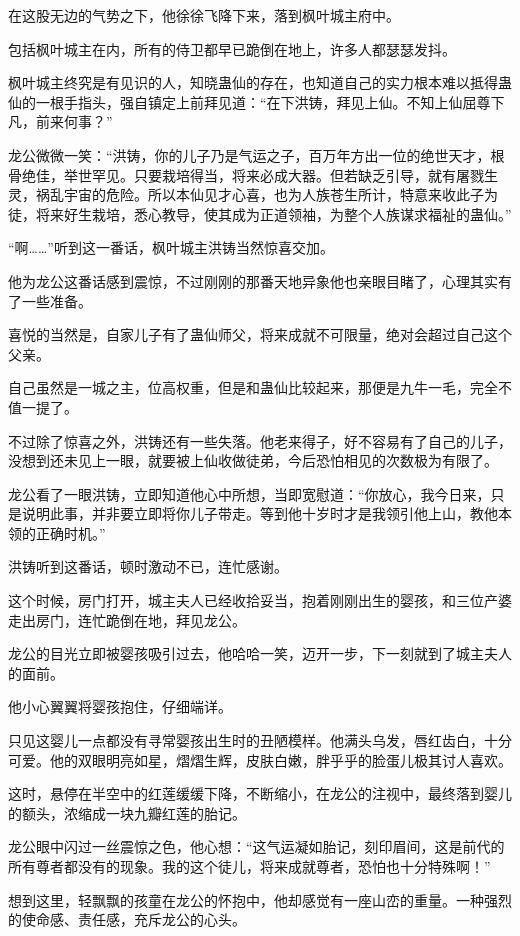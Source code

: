\begin{this_body}
在这股无边的气势之下，他徐徐飞降下来，落到枫叶城主府中。

包括枫叶城主在内，所有的侍卫都早已跪倒在地上，许多人都瑟瑟发抖。

枫叶城主终究是有见识的人，知晓蛊仙的存在，也知道自己的实力根本难以抵得蛊仙的一根手指头，强自镇定上前拜见道：“在下洪铸，拜见上仙。不知上仙屈尊下凡，前来何事？”

龙公微微一笑：“洪铸，你的儿子乃是气运之子，百万年方出一位的绝世天才，根骨绝佳，举世罕见。只要栽培得当，将来必成大器。但若缺乏引导，就有屠戮生灵，祸乱宇宙的危险。所以本仙见才心喜，也为人族苍生所计，特意来收此子为徒，将来好生栽培，悉心教导，使其成为正道领袖，为整个人族谋求福祉的蛊仙。”

“啊……”听到这一番话，枫叶城主洪铸当然惊喜交加。

他为龙公这番话感到震惊，不过刚刚的那番天地异象他也亲眼目睹了，心理其实有了一些准备。

喜悦的当然是，自家儿子有了蛊仙师父，将来成就不可限量，绝对会超过自己这个父亲。

自己虽然是一城之主，位高权重，但是和蛊仙比较起来，那便是九牛一毛，完全不值一提了。

不过除了惊喜之外，洪铸还有一些失落。他老来得子，好不容易有了自己的儿子，没想到还未见上一眼，就要被上仙收做徒弟，今后恐怕相见的次数极为有限了。

龙公看了一眼洪铸，立即知道他心中所想，当即宽慰道：“你放心，我今日来，只是说明此事，并非要立即将你儿子带走。等到他十岁时才是我领引他上山，教他本领的正确时机。”

洪铸听到这番话，顿时激动不已，连忙感谢。

这个时候，房门打开，城主夫人已经收拾妥当，抱着刚刚出生的婴孩，和三位产婆走出房门，连忙跪倒在地，拜见龙公。

龙公的目光立即被婴孩吸引过去，他哈哈一笑，迈开一步，下一刻就到了城主夫人的面前。

他小心翼翼将婴孩抱住，仔细端详。

只见这婴儿一点都没有寻常婴孩出生时的丑陋模样。他满头乌发，唇红齿白，十分可爱。他的双眼明亮如星，熠熠生辉，皮肤白嫩，胖乎乎的脸蛋儿极其讨人喜欢。

这时，悬停在半空中的红莲缓缓下降，不断缩小，在龙公的注视中，最终落到婴儿的额头，浓缩成一块九瓣红莲的胎记。

龙公眼中闪过一丝震惊之色，他心想：“这气运凝如胎记，刻印眉间，这是前代的所有尊者都没有的现象。我的这个徒儿，将来成就尊者，恐怕也十分特殊啊！”

想到这里，轻飘飘的孩童在龙公的怀抱中，他却感觉有一座山峦的重量。一种强烈的使命感、责任感，充斥龙公的心头。


\end{this_body}
